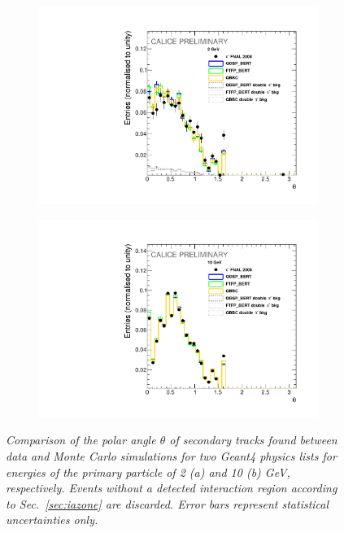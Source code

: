 \begin{figure}[H]
	\centering
	\begin{subfigure}{0.5\textwidth}
		\centering
		\includegraphics[width=.90\linewidth]{ECAL/plots/theta-2.pdf}
		\caption{\label{fig:theta2} }
	\end{subfigure}%
	\begin{subfigure}{0.5\textwidth}
		\centering
		\includegraphics[width=.90\linewidth]{ECAL/plots/theta-10.pdf}
		\caption{\label{fig:theta10} }
	\end{subfigure}
	\caption{\label{fig:thetaexample} \sl Comparison of the polar angle $\theta$ of secondary tracks found between data and Monte Carlo simulations for two {\sc Geant}4 physics lists for energies of the primary particle of 2 (a) and 10 (b) GeV, respectively. Events without a detected interaction region according to Sec.~\ref{sec:iazone} are discarded. Error bars represent statistical uncertainties only.}
\end{figure}

